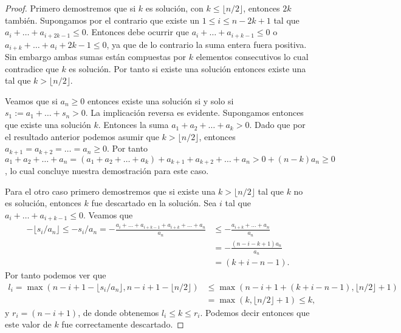 \documentclass[10pt]{amsart}
\theoremstyle{definition}
\numberwithin{equation}{section}
\begin{document}
	\begin{proof}
		Primero demostremos que si $k$ es soluci\'on, con $k \le \lfloor n/2 \rfloor $, entonces $2k$ tambi\'en. Supongamos por el contrario que existe un $1 \le i \le n - 2k + 1$ tal que $a_i + \dots + a_{i + 2k - 1} \le 0$. Entonces debe ocurrir que $a_i + \dots + a_{i + k - 1} \le 0$ o $a_{i + k} + \dots + a_i + 2k - 1 \le 0$, ya que de lo contrario la suma entera fuera positiva. Sin embargo ambas sumas est\'an compuestas por $k$ elementos consecutivos lo cual contradice que $k$ es soluci\'on. Por tanto si existe una soluci\'on entonces existe una tal que $k > \lfloor n/2 \rfloor$.
		
		Veamos que si $a_n \ge 0$ entonces existe una soluci\'on si y solo si $s_1 := a_1 + \dots + s_n > 0$. La implicaci\'on reversa es evidente. Supongamos entonces que existe una soluci\'on $k$. Entonces la suma $a_1 + a_2 + \dots + a_k > 0$. Dado que por el resultado anterior podemos asumir que $k > \lfloor n/2 \rfloor$, entonces $a_{k + 1} = a_{k + 2} = \dots = a_n \ge 0$. Por tanto $a_1 + a_2 + \dots + a_n = (a_1 + a_2 +\dots + a_k) + a_{k+1} + a_{k + 2} + \dots + a_n > 0 + (n - k)a_n \ge 0$, lo cual concluye nuestra demostraci\'on para este caso.
		
		Para el otro caso primero demostremos que si existe una $k > \lfloor n/2 \rfloor$ tal que $k$ no es soluci\'on, entonces $k$ fue descartado en la soluci\'on. Sea $i$ tal que $a_i + \dots + a_{i + k - 1} \le 0$. Veamos que
		\begin{align*}
			-\lfloor s_i/a_n \rfloor \le -s_i/a_n = -\frac{a_i + \dots + a_{i + k - 1} + a_{i + k} + \dots + a_n}{a_n} &\le - \frac{a_{i + k} + \dots + a_n}{a_n} \\ &= -\frac{(n - i - k + 1)a_n}{a_n}\\ &= (k + i - n - 1).
		\end{align*}
		Por tanto podemos ver que 
		\begin{align*}
		 l_i = \max( n - i + 1 - \lfloor s_i/a_n \rfloor, n - i  + 1 - \lfloor n/2 \rfloor) &\le \max(n- i + 1 + (k + i - n - 1), \lfloor n/2 \rfloor + 1) \\ &= \max(k, \lfloor n/2 \rfloor + 1)\le k,
		\end{align*}
		 y $r_i = (n - i + 1)$, de donde obtenemos $l_i \le k \le r_i$. Podemos decir entonces que este valor de $k$ fue correctamente descartado.
		

\end{proof}
\end{document}
